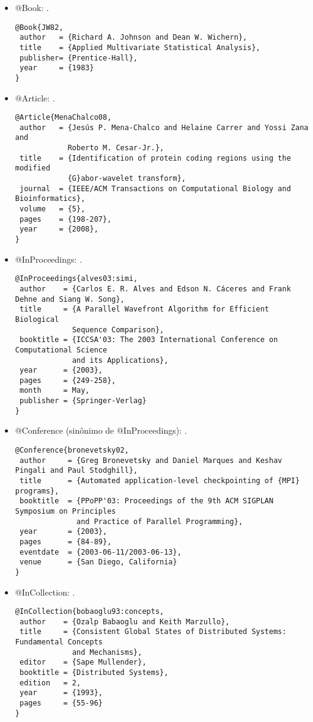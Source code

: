 \begin{itemize}
\item @Book: \cite{JW82}.
{\scriptsize\begin{verbatim}
@Book{JW82,
 author   = {Richard A. Johnson and Dean W. Wichern},
 title    = {Applied Multivariate Statistical Analysis},
 publisher= {Prentice-Hall},
 year     = {1983}
}
\end{verbatim}
}

\item @Article: \cite{MenaChalco08}.
{\scriptsize\begin{verbatim}
@Article{MenaChalco08,
 author   = {Jesús P. Mena-Chalco and Helaine Carrer and Yossi Zana and
            Roberto M. Cesar-Jr.},
 title    = {Identification of protein coding regions using the modified
            {G}abor-wavelet transform},
 journal  = {IEEE/ACM Transactions on Computational Biology and Bioinformatics},
 volume   = {5},
 pages    = {198-207},
 year     = {2008},
}
\end{verbatim}
}

\item @InProceedings: \cite{alves03:simi}.
{\scriptsize\begin{verbatim}
@InProceedings{alves03:simi,
 author    = {Carlos E. R. Alves and Edson N. Cáceres and Frank Dehne and Siang W. Song},
 title     = {A Parallel Wavefront Algorithm for Efficient Biological
             Sequence Comparison},
 booktitle = {ICCSA'03: The 2003 International Conference on Computational Science
             and its Applications},
 year      = {2003},
 pages     = {249-258},
 month     = May,
 publisher = {Springer-Verlag}
}
\end{verbatim}
}

\item @Conference (sinônimo de @InProceedings): \cite{bronevetsky02}.
{\scriptsize\begin{verbatim}
@Conference{bronevetsky02,
 author     = {Greg Bronevetsky and Daniel Marques and Keshav Pingali and Paul Stodghill},
 title      = {Automated application-level checkpointing of {MPI} programs},
 booktitle  = {PPoPP'03: Proceedings of the 9th ACM SIGPLAN Symposium on Principles
              and Practice of Parallel Programming},
 year       = {2003},
 pages      = {84-89},
 eventdate  = {2003-06-11/2003-06-13},
 venue      = {San Diego, California}
}
\end{verbatim}
}

\item @InCollection: \cite{bobaoglu93:concepts}.
{\scriptsize\begin{verbatim}
@InCollection{bobaoglu93:concepts,
 author    = {Ozalp Babaoglu and Keith Marzullo},
 title     = {Consistent Global States of Distributed Systems: Fundamental Concepts
             and Mechanisms},
 editor    = {Sape Mullender},
 booktitle = {Distributed Systems},
 edition   = 2,
 year      = {1993},
 pages     = {55-96}
}
\end{verbatim}
}


\end{itemize}
